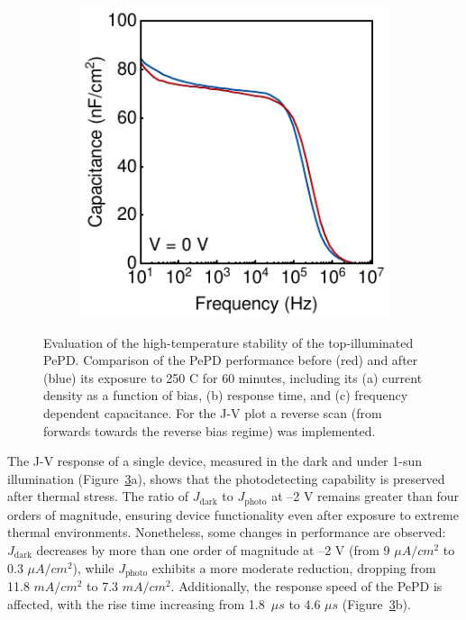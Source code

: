 \begin{figure}[htbp]
\begin{subfigure}{0.32\textwidth}
        \caption{}
        \label{}
    \end{subfigure}
    \hfill
        \begin{subfigure}{0.32\textwidth}
        \centering
        \includegraphics[width=\textwidth]{chapters/transport_layers/images/IS_Before_After.pdf}
        \caption{}
        \label{}
    \end{subfigure}
    
    \caption[Evaluation of the high-temperature stability of the top-illuminated PePD.]{Evaluation of the high-temperature stability of the top-illuminated PePD. Comparison of the PePD performance before (red) and after (blue) its exposure to 250 \degree C for 60 minutes, including its (a) current density as a function of bias, (b) response time, and (c) frequency dependent capacitance. For the J-V plot a reverse scan (from forwards towards the reverse bias regime) was implemented.}
    \label{fig:etl:temp_stability}
\end{figure}


The J-V response of a single device, measured in the dark and under 1-sun illumination (Figure~\ref{fig:etl:temp_stability}a), shows that the photodetecting capability is preserved after thermal stress. The ratio of $J_\text{dark}$ to $J_\text{photo}$ at –2 V remains greater than four orders of magnitude, ensuring device functionality even after exposure to extreme thermal environments. Nonetheless, some changes in performance are observed: $J_\text{dark}$ decreases by more than one order of magnitude at –2 V (from 9 $\mu A/cm^2$ to 0.3 $\mu A/cm^2$), while $J_\text{photo}$ exhibits a more moderate reduction, dropping from 11.8 $mA/cm^2$ to 7.3 $mA/cm^2$. Additionally, the response speed of the PePD is affected, with the rise time increasing from 1.8~$\mu s$ to 4.6 $\mu s$ (Figure~\ref{fig:etl:temp_stability}b).

